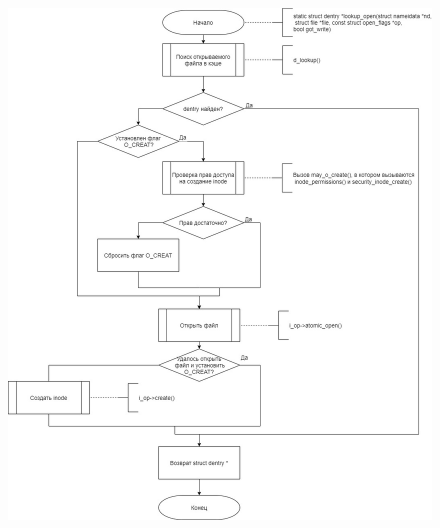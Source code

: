 \documentclass[a4paper,14pt]{extreport}
\begin{document}
\begin{figure}[H]
	\centering
	\includegraphics[scale=0.45]{img/lookup_open.jpg}
	\label{fig:lookup_open}
\end{figure}






















	
\end{document}
